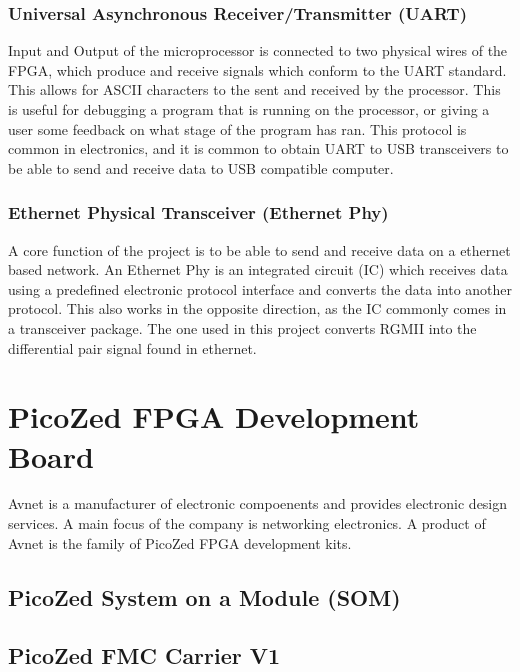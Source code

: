 \subsubsection{Universal Asynchronous Receiver/Transmitter (UART)}

\par Input and Output of the microprocessor is connected to two physical wires of the FPGA, which produce and 
receive signals which conform to the UART standard. This allows for ASCII characters to the sent and received by 
the processor. This is useful for debugging a program that is running on the processor, or giving a user some 
feedback on what stage of the program has ran. This protocol is common in electronics, and it is common to obtain 
UART to USB transceivers to be able to send and receive data to USB compatible computer.

\subsubsection{Ethernet Physical Transceiver (Ethernet Phy)}

\par A core function of the project is to be able to send and receive data on a ethernet based network. An Ethernet 
Phy is an integrated circuit (IC) which receives data using a predefined electronic protocol interface and converts 
the data into another protocol. This also works in the opposite direction, as the IC commonly comes in a transceiver 
package. The one used in this project converts RGMII into the differential pair signal found in ethernet. 

\section{PicoZed FPGA Development Board}

\par Avnet is a manufacturer of electronic compoenents and provides electronic design services. A main focus of the company
is networking electronics. A product of Avnet is the family of PicoZed FPGA development kits.

\subsection{PicoZed System on a Module (SOM)}
\subsection{PicoZed FMC Carrier V1}
